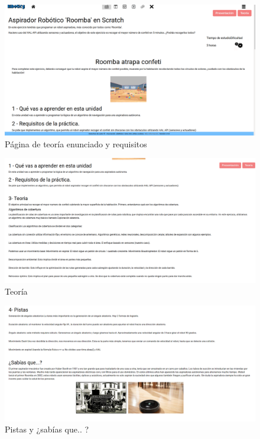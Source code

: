 \begin{figure}[H]
    \centering
    \includegraphics[width=1\textwidth, height=0.5\textwidth]{chapters/images/teoria1.png}
    \caption{Página de teoría enunciado y requisitos}
    \label{fig:my_label}
\end{figure}
\begin{figure}[H]
    \centering
    \includegraphics[width=1\textwidth, height=0.5\textwidth]{chapters/images/teoria2.png}
    \caption{Teoría}
    \label{fig:my_label}
\end{figure}
\begin{figure}[H]
    \centering
    \includegraphics[width=1\textwidth, height=0.5\textwidth]{chapters/images/teoria3.png}
    \caption{Pistas y ¿sabías que.. ?}
    \label{fig:my_label}
\end{figure}

